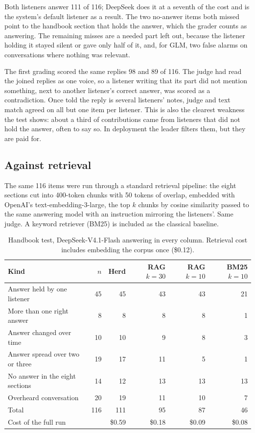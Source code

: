 \documentclass[11pt]{article}
\begin{document}
Both listeners answer 111 of 116; DeepSeek does it at a seventh of the cost and is the
system's default listener as a result. The two no-answer items both missed point to the
handbook section that holds the answer, which the grader counts as answering. The
remaining misses are a needed part left out, because the listener holding it stayed
silent or gave only half of it, and, for GLM, two false alarms on conversations where
nothing was relevant.

The first grading scored the same replies 98 and 89 of 116. The judge had read the
joined replies as one voice, so a listener writing that its part did not mention
something, next to another listener's correct answer, was scored as a contradiction.
Once told the reply is several listeners' notes, judge and text match agreed on all but
one item per listener. This is also the clearest weakness the test shows: about a third
of contributions came from listeners that did not hold the answer, often to say so. In
deployment the leader filters them, but they are paid for.

\subsection{Against retrieval}\label{sec:rag}

The same 116 items were run through a standard retrieval pipeline: the eight sections
cut into 400-token chunks with 50 tokens of overlap, embedded with OpenAI's
text-embedding-3-large, the top $k$ chunks by cosine similarity passed to the same
answering model with an instruction mirroring the listeners'. Same judge. A keyword
retriever (BM25) is included as the classical baseline.

\begin{table}[h]
\centering
\begin{tabular}{lrrrrr}
\toprule
Kind & $n$ & Herd & RAG $k{=}30$ & RAG $k{=}10$ & BM25 $k{=}10$ \\
\midrule
Answer held by one listener      & 45 & 45 & 43 & 43 & 21 \\
More than one right answer       &  8 &  8 &  8 &  8 &  1 \\
Answer changed over time         & 10 & 10 &  9 &  8 &  3 \\
Answer spread over two or three  & 19 & 17 & 11 &  5 &  1 \\
No answer in the eight sections  & 14 & 12 & 13 & 13 & 13 \\
Overheard conversation           & 20 & 19 & 11 & 10 &  7 \\
\midrule
Total                            & 116 & 111 & 95 & 87 & 46 \\
Cost of the full run             &     & \$0.59 & \$0.18 & \$0.09 & \$0.08 \\
\bottomrule
\end{tabular}
\caption{Handbook test, DeepSeek-V4.1-Flash answering in every column. Retrieval cost
includes embedding the corpus once (\$0.12).}
\end{table}
\end{document}
